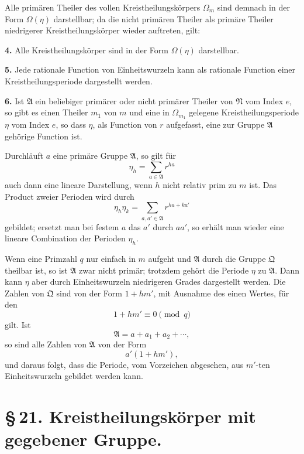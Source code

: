 \documentclass[11pt]{article}
\providecommand{\grpA}{\mathfrak A}
\providecommand{\grpN}{\mathfrak N}
\providecommand{\grpQ}{\mathfrak Q}
\begin{document}
Alle primären Theiler des vollen Kreistheilungskörpers $\Omega_m$ sind demnach in der Form $\Omega(\eta)$ darstellbar; da die nicht primären Theiler als primäre Theiler niedrigerer Kreistheilungskörper wieder auftreten, gilt:

\medskip
\noindent\textbf{4.} Alle Kreistheilungskörper sind in der Form $\Omega(\eta)$ darstellbar.

\medskip
\noindent\textbf{5.} Jede rationale Function von Einheitswurzeln kann als rationale Function einer Kreistheilungsperiode dargestellt werden.

\medskip
\noindent\textbf{6.} Ist $\grpA$ ein beliebiger primärer oder nicht primärer Theiler von $\grpN$ vom Index $e$, so gibt es einen Theiler $m_1$ von $m$ und eine in $\Omega_{m_1}$ gelegene Kreistheilungsperiode $\eta$ vom Index $e$, so dass $\eta$, als Function von $r$ aufgefasst, eine zur Gruppe $\grpA$ gehörige Function ist.

Durchläuft $a$ eine primäre Gruppe $\grpA$, so gilt für
\[
 \eta_h=\sum_{a\in\grpA}r^{ha}
\]
auch dann eine lineare Darstellung, wenn $h$ nicht relativ prim zu $m$ ist. Das Product zweier Perioden wird durch
\[
 \eta_h\eta_k=\sum_{a,a'\in\grpA}r^{ha+ka'}
\]
gebildet; ersetzt man bei festem $a$ das $a'$ durch $aa'$, so erhält man wieder eine lineare Combination der Perioden $\eta_h$.

Wenn eine Primzahl $q$ nur einfach in $m$ aufgeht und $\grpA$ durch die Gruppe $\grpQ$ theilbar ist, so ist $\grpA$ zwar nicht primär; trotzdem gehört die Periode $\eta$ zu $\grpA$. Dann kann $\eta$ aber durch Einheitswurzeln niedrigeren Grades dargestellt werden. Die Zahlen von $\grpQ$ sind von der Form $1+hm'$, mit Ausnahme des einen Wertes, für den
\begin{equation}
 1+hm'\equiv0\pmod q
\tag{18}
\end{equation}
gilt. Ist
\begin{equation}
 \grpA=a+a_1+a_2+\cdots,
\end{equation}
so sind alle Zahlen von $\grpA$ von der Form
\begin{equation}
 a'(1+hm'),
\tag{19}
\end{equation}
und daraus folgt, dass die Periode, vom Vorzeichen abgesehen, aus $m'$-ten Einheitswurzeln gebildet werden kann.

\section*{\S\,21. Kreistheilungskörper mit gegebener Gruppe.}
\end{document}

